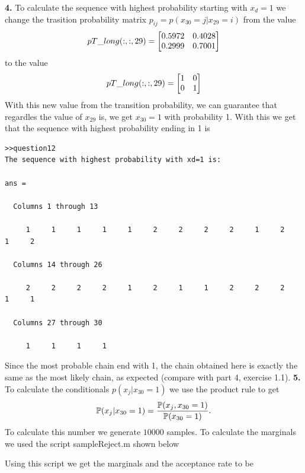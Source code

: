 \documentclass{article}
\begin{document}
\textbf{4.}
\newline
To calculate the sequence with highest probability starting with $x_{d}=1$ we change the trasition probability matrix
$p_{ij}=p(x_{30}=j|x_{29}=i)$ from the value
\begin{equation*}
pT\_long(:,:,29)=\begin{bmatrix}
0.5972 & 0.4028 \\
0.2999 & 0.7001
\end{bmatrix}
\end{equation*}
to the value
\begin{equation*}
pT\_long(:,:,29)=\begin{bmatrix}
1 & 0 \\
0 & 1
\end{bmatrix}
\end{equation*}
With this new value from the transition probability, we can guarantee that regardles the value of $x_{29}$ is, we get $x_{30}=1$
with probability 1. With this we get that the sequence with highest probability ending in 1 is
\begin{verbatim}
>>question12
The sequence with highest probability with xd=1 is: 

ans =

  Columns 1 through 13

     1     1     1     1     1     2     2     2     2     1     2     1     2

  Columns 14 through 26

     2     2     2     2     1     2     1     1     2     2     2     1     1

  Columns 27 through 30

     1     1     1     1
\end{verbatim}
Since the most probable chain end with 1, the chain obtained here is exactly the same as the most likely chain, as expected (compare with part 4, exercise 1.1).
\newline
\textbf{5.}
\newline
To calculate the conditionals $p(x_{j}|x_{30}=1)$ we use the product rule to get
\begin{equation*}
\mathbb{P}(x_{j}|x_{30}=1)=\frac{\mathbb{P}(x_{j},x_{30}=1)}{\mathbb{P}(x_{30}=1)}.
\end{equation*}
To calculate this number we generate $10000$ samples. To calculate the marginals we used the script sampleReject.m shown below



Using this script we get the marginals and the acceptance rate to be
\end{document}

